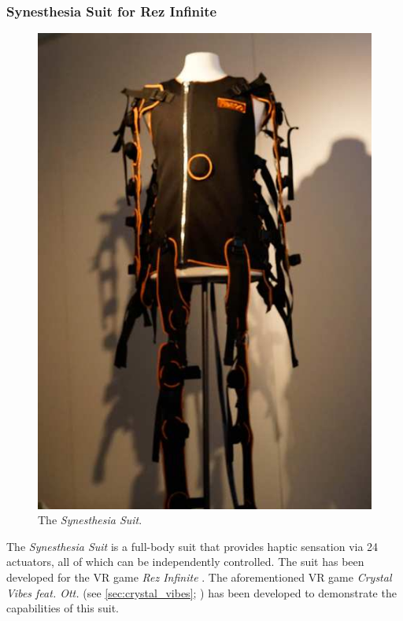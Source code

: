\newpage
\subsubsection{Synesthesia Suit for Rez Infinite}\label{sec:synesthesia_suit}
\begin{figure}
    \centering
    \includegraphics[width=\textwidth * \real{0.40}]{img/reused/konishi2016synesthesia.png}
    \caption{The \textit{Synesthesia Suit}.\protect\footnotemark}
\end{figure}

The \textit{Synesthesia Suit} \autocites{konishi2016synesthesia1}{konishi2016synesthesia2}{synesthesia2016suit} is a full-body suit that provides haptic sensation via 24 actuators, all of which can be independently controlled. The suit has been developed for the \ac{VR} game \textit{Rez Infinite} \autocite{enhance2016rezinfinite}. The aforementioned \ac{VR} game \textit{Crystal Vibes feat. Ott.} (see \ref{sec:crystal_vibes}; \textcite{outram2017crystal}) has been developed to demonstrate the capabilities of this suit.

